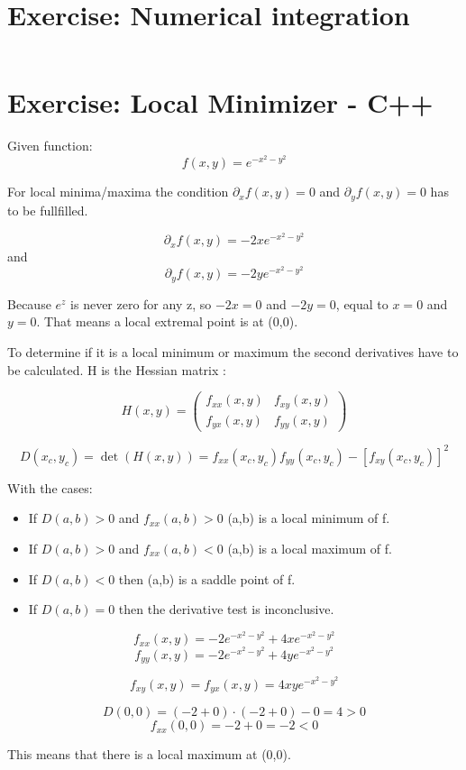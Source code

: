 \documentclass[11pt]{article}
\begin{document}
\date{\today}

\section{Exercise: Numerical integration}
\begin{lstlisting}
\end{lstlisting}

\section{Exercise: Local Minimizer - C++}

Given function: 
\[ f(x,y) = e^{-x^2 - y^2} \]

For local minima/maxima the condition $\partial_x f(x,y) = 0$ and $\partial_y f(x,y) = 0$ has to be fullfilled.

\[ \partial_x f(x,y) = -2 x  e^{-x^2 - y^2} \]
and 
\[ \partial_y f(x,y) = -2 y  e^{-x^2 - y^2} \]

Because $e^z$ is never zero for any z, so $ -2 x = 0$ and $ -2 y = 0$, equal to $x = 0$ and $y = 0$. That means a local extremal point is at (0,0).

To determine if it is a local minimum or maximum the second derivatives have to be calculated. H is the Hessian matrix :

\[ H(x,y) = \begin{pmatrix}
f_{xx}(x,y) & f_{xy}(x,y) \\
f_{yx}(x,y) & f_{yy}(x,y)
\end{pmatrix} \]

\[ D(x_c,y_c) = \det(H(x,y)) = f_{xx}(x_c,y_c) f_{yy}(x_c,y_c) - [f_{xy}(x_c,y_c)]^2 \]

With the cases:

\begin{itemize}
	\item{If $D(a,b) > 0$ and $f_{xx}(a,b) > 0$  (a,b) is a local minimum of f.}
	\item{If $D(a,b) > 0$ and $f_{xx}(a,b) < 0$  (a,b) is a local maximum of f.}
	\item{If $D(a,b) < 0$ then (a,b) is a saddle point of f.}
	\item{If $D(a,b) = 0$ then the derivative test is inconclusive.}
\end{itemize}
  
\[ f_{xx}(x,y) = -2 e^{-x^2-y^2} + 4 x e^{-x^2-y^2} \]
\[ f_{yy}(x,y) = -2 e^{-x^2-y^2} + 4 y e^{-x^2-y^2} \]

\[ f_{xy}(x,y) = f_{yx}(x,y) = 4 x y e^{-x^2-y^2} \]

\[ D(0,0) = (-2 + 0)\cdot (-2 + 0 ) - 0 = 4 > 0 \]
\[ f_{xx}(0,0) = -2 + 0 = -2 < 0 \]

This means that there is a local maximum at (0,0).


\begin{lstlisting}

\end{lstlisting}
\end{document}
